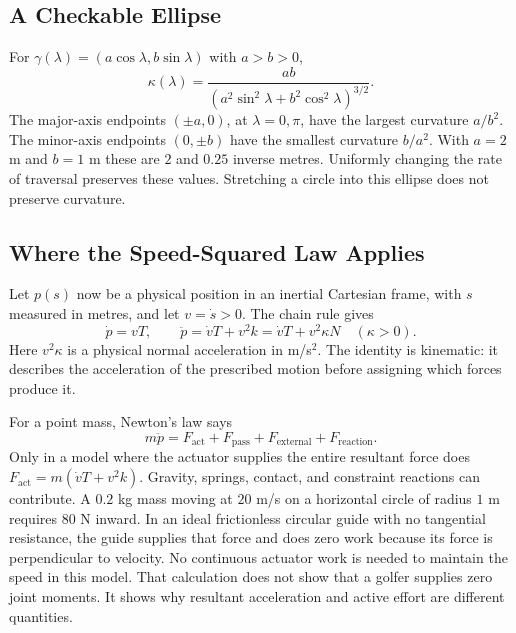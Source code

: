 \documentclass[12pt, openany]{book}
\theoremstyle{plain}
\begin{document}
\subsection{A Checkable Ellipse}

For $\gamma(\lambda)=(a\cos\lambda,b\sin\lambda)$ with $a>b>0$,
\begin{equation}
 \kappa(\lambda)=\frac{ab}
 {(a^2\sin^2\lambda+b^2\cos^2\lambda)^{3/2}}.
\end{equation}
The major-axis endpoints $(\pm a,0)$, at $\lambda=0,\pi$, have the largest
curvature $a/b^2$. The minor-axis endpoints $(0,\pm b)$ have the smallest
curvature $b/a^2$. With $a=2$ m and $b=1$ m these are $2$ and $0.25$ inverse
metres. Uniformly changing the rate of traversal preserves these values.
Stretching a circle into this ellipse does not preserve curvature.

\subsection{Where the Speed-Squared Law Applies}

Let $p(s)$ now be a physical position in an inertial Cartesian frame, with
$s$ measured in metres, and let $v=\dot s>0$. The chain rule gives
\begin{equation}\label{eq:centripetal}
 \dot p=vT,\qquad \ddot p=\dot vT+v^2k
 =\dot vT+v^2\kappa N\quad(\kappa>0).
\end{equation}
Here $v^2\kappa$ is a physical normal acceleration in m/s$^2$. The identity
is kinematic: it describes the acceleration of the prescribed motion before
assigning which forces produce it.

For a point mass, Newton's law says
\begin{equation}\label{eq:control_demand}
 m\ddot p=F_{\mathrm{act}}+F_{\mathrm{pass}}+F_{\mathrm{external}}
 +F_{\mathrm{reaction}}.
\end{equation}
Only in a model where the actuator supplies the entire resultant force does
$F_{\mathrm{act}}=m(\dot vT+v^2k)$. Gravity, springs, contact, and constraint
reactions can contribute. A $0.2$ kg mass moving at $20$ m/s on a horizontal
circle of radius $1$ m requires $80$ N inward. In an ideal frictionless
circular guide with no tangential resistance, the guide supplies that force
and does zero work because its force is perpendicular to velocity. No
continuous actuator work is needed to maintain the speed in this model.
That calculation does not show that a golfer supplies zero joint moments.
It shows why resultant acceleration and active effort are different
quantities.
\end{document}
